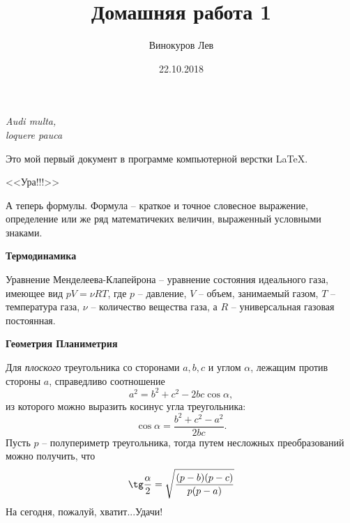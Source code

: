 \documentclass[12pt]{article}
\title{Домашняя работа 1}
\author{Винокуров Лев}
\date{22.10.2018}
\begin{document}
	\maketitle
	
	\begin{flushright}
		\textit{ Audi multa,\\
	 	loquere pauca}
	\end{flushright}
	\vspace{20pt}
	Это мой первый документ в программе компьютерной верстки \LaTeX.
	
	\begin{center}
		\Huge <<Ура!!!>>
		
	\end{center}			
	А теперь формулы. \large Формула -- \normalsize краткое и точное словесное выражение, определение или же ряд математичеких величин, выраженный условными знаками.
	
	\vspace{15pt}
	\hspace{28pt}
	\textbf{\Large Термодинамика}
	
	Уравнение Менделеева-Клапейрона -- уравнение состояния идеального газа, имеющее вид $pV = \nu RT$, где $p$ -- давление, $V$ -- объем, занимаемый газом, $T$ -- температура газа, $\nu$ -- количество вещества газа, а $R$ -- универсальная газовая постоянная. 
	
	\vspace{15pt}
	\hspace{28pt}
	\textbf{\Large Геометрия \hfill Планиметрия}
	
	Для \textit{плоского} треугольника со сторонами $a, b, c$ и углом $\alpha$, лежащим против стороны $a$, справедливо соотношение
	$$
	a^2 = b^2 + c^2 - 2bc\cos\alpha,
	$$
	из которого можно выразить косинус угла треугольника:
	$$
	\cos\alpha = \frac{b^2 + c^2 - a^2}{2bc}.
	$$
	\newpage
	Пусть $p$ -- полупериметр треугольника, тогда путем несложных преобразований можно получить, что
	$$
	\tg\frac{\alpha}{2} = \sqrt{\frac{(p - b)(p - c)}{p(p - a)}}
	$$
	\vspace{1cm}
	На сегодня, пожалуй, хватит...Удачи!
	
	
		
\end{document}
